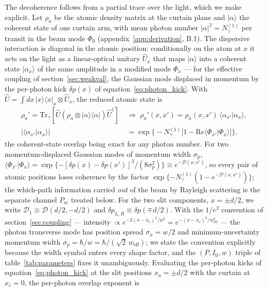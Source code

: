 \documentclass[11pt,a4paper]{article}
\newcommand{\bra}[1]{\langle #1 |}
\newcommand{\ket}[1]{| #1 \rangle}
\newcommand{\braket}[2]{\langle #1 | #2 \rangle}
\begin{document}
The decoherence follows from a partial trace over the light, which we make explicit. Let $\rho_a$ be the atomic density matrix at the curtain plane and $\ket{\alpha}$ the coherent state of one curtain arm, with mean photon number $|\alpha|^2 = N_\gamma^{(1)}$ per transit in the beam mode $\Phi_0$ (appendix~\ref{app:derivation}, B.1). The dispersive interaction is diagonal in the atomic position: conditionally on the atom at $x$ it acts on the light as a linear-optical unitary $\hat{U}_x$ that maps $\ket{\alpha}$ into a coherent state $\ket{\alpha_x}$ of the same amplitude in a modified mode $\Phi_x$ --- for the effective coupling of section~\ref{sec:weakval}, the Gaussian mode displaced in momentum by the per-photon kick $\delta p(x)$ of equation~\eqref{eq:photon_kick}. With $\hat{U} = \int dx\,\ket{x}\bra{x}_a\otimes\hat{U}_x$, the reduced atomic state is
\begin{align}
\rho_a' = \mathrm{Tr}_\gamma\!\left[\hat{U}\left(\rho_a\otimes\ket{\alpha}\bra{\alpha}\right)\hat{U}^\dagger\right]
\;&\Longrightarrow\;
\rho_a'(x, x') = \rho_a(x, x')\,\braket{\alpha_{x'}}{\alpha_x}, \nonumber\\
\big|\braket{\alpha_{x'}}{\alpha_x}\big| &= \exp\!\Big\{-N_\gamma^{(1)}\big[1 - \mathrm{Re}\braket{\Phi_{x'}}{\Phi_x}\big]\Big\},
\label{eq:partial_trace}
\end{align}
the coherent-state overlap being exact for any photon number. For two momentum-displaced Gaussian modes of momentum width $\sigma_p$, $\braket{\Phi_{x'}}{\Phi_x} = \exp\{-[\delta p(x) - \delta p(x')]^2/(8\sigma_p^2)\} \equiv e^{-\mathcal{D}(x, x')}$, so every pair of atomic positions loses coherence by the factor $\exp\{-N_\gamma^{(1)}(1 - e^{-\mathcal{D}(x, x')})\}$; the which-path information carried \emph{out} of the beam by Rayleigh scattering is the separate channel $P_\text{sc}$ treated below. For the two slit components, $x = \pm d/2$, we write $\mathcal{D}_1 \equiv \mathcal{D}(d/2, -d/2)$ and $\delta p_{L,R} \equiv \delta p(\mp d/2)$. With the $1/e^2$ convention of section~\ref{sec:coupling} --- intensity $\propto e^{-2(x-x_c)^2/w^2} = e^{-(x-x_c)^2/w_\text{eff}^2}$ --- the photon transverse mode has position spread $\sigma_x = w/2$ and minimum-uncertainty momentum width $\sigma_p = \hbar/w = \hbar/(\sqrt{2}\,w_\text{eff})$; we state the convention explicitly because the width symbol enters every shape factor, and the $(P, I_0, w)$ triple of table~\ref{tab:parameters} fixes it unambiguously. Evaluating the per-photon kicks of equation~\eqref{eq:photon_kick} at the slit positions $x_a = \pm d/2$ with the curtain at $x_c = 0$, the per-photon overlap exponent is
\end{document}
